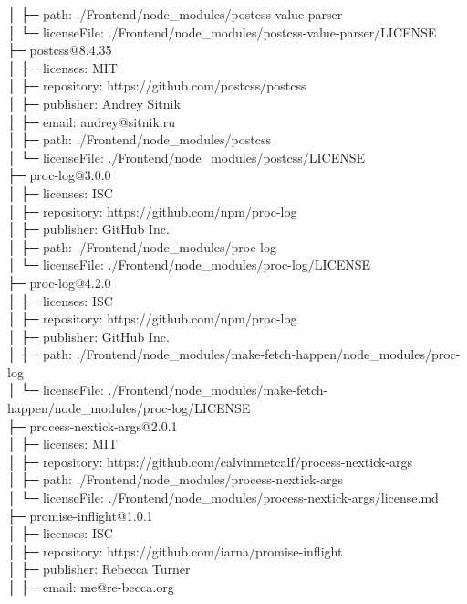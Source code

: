 │  ├─ path: ./Frontend/node\_modules/postcss-value-parser\\
│  └─ licenseFile: ./Frontend/node\_modules/postcss-value-parser/LICENSE\\
├─ postcss@8.4.35\\
│  ├─ licenses: MIT\\
│  ├─ repository: https://github.com/postcss/postcss\\
│  ├─ publisher: Andrey Sitnik\\
│  ├─ email: andrey@sitnik.ru\\
│  ├─ path: ./Frontend/node\_modules/postcss\\
│  └─ licenseFile: ./Frontend/node\_modules/postcss/LICENSE\\
├─ proc-log@3.0.0\\
│  ├─ licenses: ISC\\
│  ├─ repository: https://github.com/npm/proc-log\\
│  ├─ publisher: GitHub Inc.\\
│  ├─ path: ./Frontend/node\_modules/proc-log\\
│  └─ licenseFile: ./Frontend/node\_modules/proc-log/LICENSE\\
├─ proc-log@4.2.0\\
│  ├─ licenses: ISC\\
│  ├─ repository: https://github.com/npm/proc-log\\
│  ├─ publisher: GitHub Inc.\\
│  ├─ path: ./Frontend/node\_modules/make-fetch-happen/node\_modules/proc-log\\
│  └─ licenseFile: ./Frontend/node\_modules/make-fetch-happen/node\_modules/proc-log/LICENSE\\
├─ process-nextick-args@2.0.1\\
│  ├─ licenses: MIT\\
│  ├─ repository: https://github.com/calvinmetcalf/process-nextick-args\\
│  ├─ path: ./Frontend/node\_modules/process-nextick-args\\
│  └─ licenseFile: ./Frontend/node\_modules/process-nextick-args/license.md\\
├─ promise-inflight@1.0.1\\
│  ├─ licenses: ISC\\
│  ├─ repository: https://github.com/iarna/promise-inflight\\
│  ├─ publisher: Rebecca Turner\\
│  ├─ email: me@re-becca.org\\
